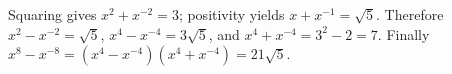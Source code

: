 Squaring gives $x^2+x^{-2}=3$; positivity yields $x+x^{-1}=\sqrt5$. Therefore $x^2-x^{-2}=\sqrt5$, $x^4-x^{-4}=3\sqrt5$, and $x^4+x^{-4}=3^2-2=7$. Finally $x^8-x^{-8}=(x^4-x^{-4})(x^4+x^{-4})=\boxed{21\sqrt5}$.
